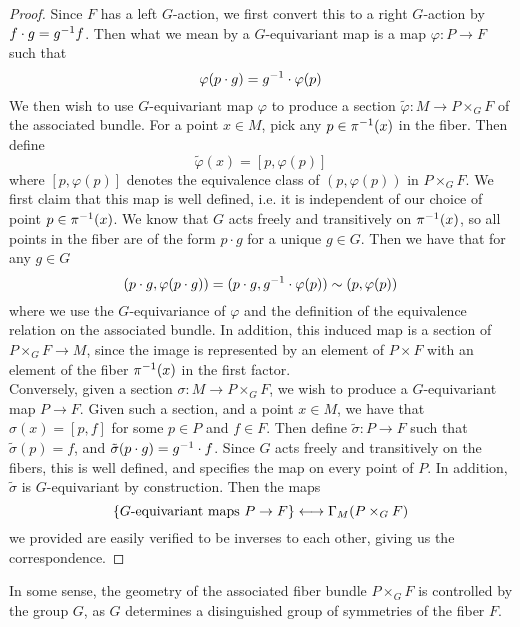 \begin{proof}
Since $F$ has a left $G$-action, we first convert this to a right $G$-action
by $f \cdot g = g^{-1} f$. Then what we mean by a $G$-equivariant map is
a map $\varphi : P \to F$ such that
\[
\varphi(p\cdot g) = g^{-1}\cdot \varphi(p)
\]
We then wish to use $G$-equivariant map $\varphi$ to produce a section
$\tilde{\varphi} : M \to P \times_G F$ of the associated bundle. For a
point $x \in M$, pick any $p \in \pi^{-1}(x)$ in the fiber. Then define
\[
\tilde{\varphi}(x) = [p, \varphi(p)]
\]
where $[p, \varphi(p)]$ denotes the equivalence class of $(p, \varphi(p))$ in
$P \times_G F$. We first claim that this map is well defined, i.e. it is
independent of our choice of point $p \in \pi^{-1}(x)$. We know that $G$ acts
freely and transitively on $\pi^{-1}(x)$, so all points in the fiber are of
the form $p \cdot g$ for a unique $g \in G$. Then we have that for any $g \in G$
\[
(p\cdot g, \varphi(p \cdot g)) = (p \cdot g, g^{-1} \cdot \varphi(p)) \sim (p, \varphi(p))
\]
where we use the $G$-equivariance of $\varphi$ and the definition of the equivalence
relation on the associated bundle. In addition, this induced map is
a section of $P \times_G F \to M$, since the image is represented by an
element of $P \times F$ with an element of the fiber $\pi^{-1}(x)$ in the first
factor. \\

Conversely, given a section $\sigma : M \to P \times_G F$, we wish to produce
a $G$-equivariant map $P \to F$. Given such a section, and a point $x \in M$,
we have that $\sigma(x) = [p, f]$ for some $p \in P$ and $f \in F$. Then
define $\tilde{\sigma} : P \to F$ such that $\tilde{\sigma}(p) = f$, and
$\tilde{\sigma}(p \cdot g) = g^{-1} \cdot f$. Since $G$ acts freely and transitively
on the fibers, this is well defined, and specifies the map on every
point of $P$. In addition, $\tilde{\sigma}$ is $G$-equivariant by construction.
Then the maps
\[
\left\lbrace G\text{-equivariant maps } P \to F \right\rbrace \longleftrightarrow \Gamma_M(P \times_G F)
\]
we provided are easily verified to be inverses to each other, giving us the
correspondence.
\end{proof}
%
In some sense, the geometry of the associated fiber bundle $P \times_G F$
is controlled by the group $G$, as $G$ determines a disinguished
group of symmetries of the fiber $F$.
%

